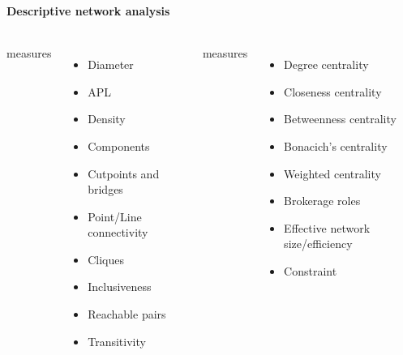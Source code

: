 \documentclass[8pt]{beamer}
\begin{document}

\begin{frame}
\frametitle{\insertsection}
\framesubtitle{Descriptive network analysis}

\medskip
\medskip

\begin{columns}[t]
{\color{blue}{Network-level}} measures
        \begin{itemize}
        \item Diameter
        \item APL
        \item Density
        \item Components
        \item Cutpoints and bridges
        \item Point/Line connectivity
        \item Cliques 
        \item Inclusiveness
        \item Reachable pairs 
        \item Transitivity
        \end{itemize}


{\color{blue}{Node-level}} measures
        \begin{itemize}
        \item Degree centrality
        \item Closeness centrality
        \item Betweenness centrality
        \item Bonacich's centrality
        \item Weighted centrality
        \item Brokerage roles
        \item Effective network size/efficiency
        \item Constraint
        \end{itemize}
            
\end{columns}

\end{frame}

\end{document}
